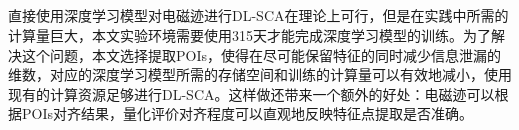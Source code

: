 {{	%
	\subsection{\yuchuli}\label{subs:selectpoi}

	直接使用深度学习模型对电磁迹进行DL-SCA在理论上可行，但是在实践中所需的计算量巨大，本文实验环境需要使用315天才能完成深度学习模型的训练。为了解决这个问题，本文选择提取POIs，使得在尽可能保留特征的同时减少信息泄漏的维数，对应的深度学习模型所需的存储空间和训练的计算量可以有效地减小，使用现有的计算资源足够进行DL-SCA。这样做还带来一个额外的好处：电磁迹可以根据POIs对齐结果，量化评价对齐程度可以直观地反映特征点提取是否准确。
{	
	
%	
%	
%	
%	
%	
%		
%	
	
}}}
